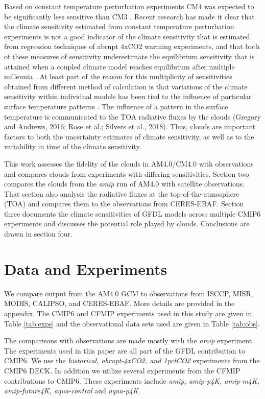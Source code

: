 \documentclass[draft]{agujournal2019}
\begin{document}
Based on constant temperature perturbation experiments CM4 was expected to be significantly less sensitive 
than CM3 \cite{Zhao_2014}.
Recent research has made it clear that the climate sensitivity estimated from constant temperature perturbation 
experiments is not a good indicator of the climate sensitivity that is estimated from regression techniques of 
abrupt 4xCO2 warming experiments, and that both 
of these measures of sensitivity underestimate the equilibrium sensitivity that is attained when a coupled climate 
model reaches equilibrium after multiple millennia \cite{Paynter_etal_2018,Rugenstein_etal_2020}.     
At least part of the reason for this multiplicity of 
sensitivities obtained from different method of calculation is that variations of the climate sensitivity within 
individual models has been tied to the influence of particular surface temperature patterns 
\cite{Gregory_Andrews_2016, Zhou_etal_2016, Andrews_Webb_2018, Silvers_etal_2018}.   
The influence of a pattern in the surface temperature is communicated to the TOA radiative fluxes by the clouds 
(Gregory and Andrews, 2016; Rose et al.; Silvers et al., 2018).   Thus, clouds are important factors to both the uncertainty 
estimates of climate sensitivity, as well as to the variability in time of the climate sensitivity.  

This work assesses the fidelity of the clouds in AM4.0/CM4.0 with observations and compares clouds from experiments 
with differing sensitivities. 
Section two compares the clouds from the \textit{amip} run of AM4.0 with satellite observations.  That section also 
analysis the radiative fluxes at the top-of-the-atmosphere (TOA) and compares them to the observations from 
CERES-EBAF.    Section three documents the climate sensitivities of GFDL models across multiple CMIP6 experiments 
and discusses the potential role played by clouds.   Conclusions are drawn in section four.  

\section{Data and Experiments}

We compare output from the AM4.0 GCM to observations from ISCCP, MISR, MODIS, CALIPSO, and CERES-EBAF.
More details are provided in the appendix.  The CMIP6 and CFMIP experiments used in this study are given in Table
\ref{tab:exps} and the observational data sets used are given in Table \ref{tab:obs}.

The comparisons with observations are made mostly with the \textit{amip} experiment.   The experiments used 
in this paper are all part of the GFDL contribution to CMIP6.  We use the \textit{historical, abrupt-4xCO2, and 1pctCO2}
experiments from the CMIP6 DECK.  In addition we utilize several experiments from the CFMIP contributions 
to CMIP6.  These experiments include \textit{amip, amip-p4K, amip-m4K, amip-future4K, aqua-control} and \textit{aqua-p4K}. 
\end{document}
